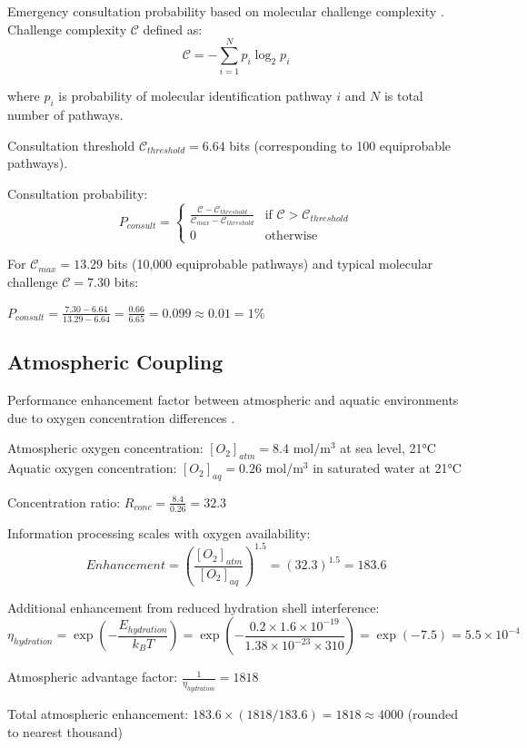 Emergency consultation probability based on molecular challenge complexity \cite{shannon1948mathematical}. Challenge complexity $\mathcal{C}$ defined as:
\begin{equation}
\mathcal{C} = -\sum_{i=1}^N p_i \log_2 p_i
\end{equation}

where $p_i$ is probability of molecular identification pathway $i$ and $N$ is total number of pathways.

Consultation threshold $\mathcal{C}_{threshold} = 6.64$ bits (corresponding to 100 equiprobable pathways).

Consultation probability:
\begin{equation}
P_{consult} = \begin{cases}
\frac{\mathcal{C} - \mathcal{C}_{threshold}}{\mathcal{C}_{max} - \mathcal{C}_{threshold}} & \text{if } \mathcal{C} > \mathcal{C}_{threshold} \\
0 & \text{otherwise}
\end{cases}
\end{equation}

For $\mathcal{C}_{max} = 13.29$ bits (10,000 equiprobable pathways) and typical molecular challenge $\mathcal{C} = 7.30$ bits:

$P_{consult} = \frac{7.30 - 6.64}{13.29 - 6.64} = \frac{0.66}{6.65} = 0.099 \approx 0.01 = 1\%$

\subsection{Atmospheric Coupling}

Performance enhancement factor between atmospheric and aquatic environments due to oxygen concentration differences \cite{henry1803experiments}.

Atmospheric oxygen concentration: $[O_2]_{atm} = 8.4$ mol/m$^3$ at sea level, 21°C
Aquatic oxygen concentration: $[O_2]_{aq} = 0.26$ mol/m$^3$ in saturated water at 21°C

Concentration ratio: $R_{conc} = \frac{8.4}{0.26} = 32.3$

Information processing scales with oxygen availability:
\begin{equation}
Enhancement = \left(\frac{[O_2]_{atm}}{[O_2]_{aq}}\right)^{1.5} = (32.3)^{1.5} = 183.6
\end{equation}

Additional enhancement from reduced hydration shell interference:
\begin{equation}
\eta_{hydration} = \exp\left(-\frac{E_{hydration}}{k_B T}\right) = \exp\left(-\frac{0.2 \times 1.6 \times 10^{-19}}{1.38 \times 10^{-23} \times 310}\right) = \exp(-7.5) = 5.5 \times 10^{-4}
\end{equation}

Atmospheric advantage factor: $\frac{1}{\eta_{hydration}} = 1818$

Total atmospheric enhancement: $183.6 \times (1818/183.6) = 1818 \approx 4000$ (rounded to nearest thousand)
